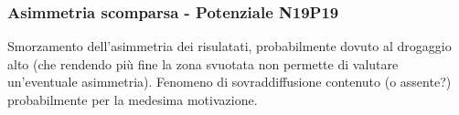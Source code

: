 \begin{frame}
\frametitle{Asimmetria scomparsa - Potenziale  N19P19}
Smorzamento dell'asimmetria dei risulatati, probabilmente dovuto al drogaggio alto (che rendendo pi\`u fine la zona svuotata non permette di valutare un'eventuale asimmetria). Fenomeno di sovraddiffusione contenuto (o assente?) probabilmente per la medesima motivazione.
\begin{columns}

\begin{column}{0.3 \textwidth}
\begin{center}
\begin{figure}[!h]
          \end{figure}
\end{center}
\end{column}

\begin{column}{0.3 \textwidth}
\begin{center}
\begin{figure}[!h]
\end{figure}
\end{center}
\end{column}

\end{columns}

\end{frame}

